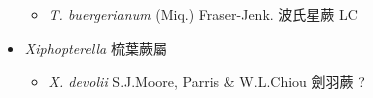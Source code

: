 \begin{itemize}
  \begin{itemize}
        \item[] \textit{T. buergerianum} (Miq.) Fraser-Jenk.  波氏星蕨   LC
  \end{itemize}
 \item[] \textit{Xiphopterella} 梳葉蕨屬
                                
  \begin{itemize}
        \item[] \textit{X. devolii} S.J.Moore, Parris \& W.L.Chiou  劍羽蕨   ?
  \end{itemize}
  \end{itemize}
